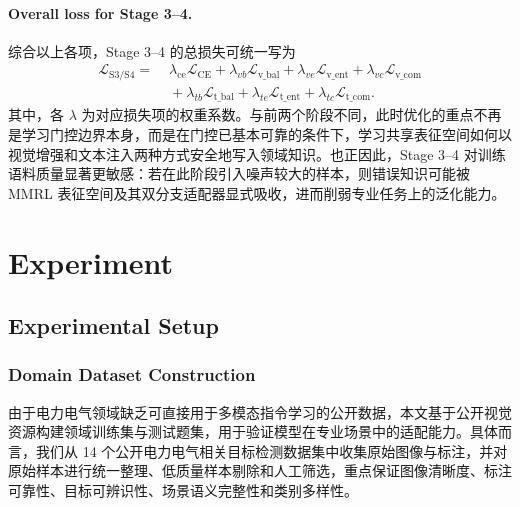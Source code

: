\documentclass[journal]{IEEEtran}
\begin{document}
\paragraph{Overall loss for Stage 3--4.}
综合以上各项，Stage 3--4 的总损失可统一写为
\begin{align}
\mathcal{L}_{\mathrm{S}3/\mathrm{S}4}
=
&\;
\lambda_{\mathrm{ce}}\mathcal{L}_{\mathrm{CE}}
+\lambda_{vb}\mathcal{L}_{\mathrm{v\_bal}}
+\lambda_{ve}\mathcal{L}_{\mathrm{v\_ent}}
+\lambda_{vc}\mathcal{L}_{\mathrm{v\_com}}
\nonumber\\
&\;
+\lambda_{tb}\mathcal{L}_{\mathrm{t\_bal}}
+\lambda_{te}\mathcal{L}_{\mathrm{t\_ent}}
+\lambda_{tc}\mathcal{L}_{\mathrm{t\_com}}.
\label{eq:full_loss}
\end{align}
其中，各 $\lambda$ 为对应损失项的权重系数。与前两个阶段不同，此时优化的重点不再是学习门控边界本身，而是在门控已基本可靠的条件下，学习共享表征空间如何以视觉增强和文本注入两种方式安全地写入领域知识。也正因此，Stage 3--4 对训练语料质量显著更敏感：若在此阶段引入噪声较大的样本，则错误知识可能被 MMRL 表征空间及其双分支适配器显式吸收，进而削弱专业任务上的泛化能力。







\section{Experiment}

\subsection{Experimental Setup}

\subsubsection{Domain Dataset Construction}

由于电力电气领域缺乏可直接用于多模态指令学习的公开数据，本文基于公开视觉资源构建领域训练集与测试题集，用于验证模型在专业场景中的适配能力。具体而言，我们从 14 个公开电力电气相关目标检测数据集中收集原始图像与标注，并对原始样本进行统一整理、低质量样本剔除和人工筛选，重点保证图像清晰度、标注可靠性、目标可辨识性、场景语义完整性和类别多样性。
\end{document}
